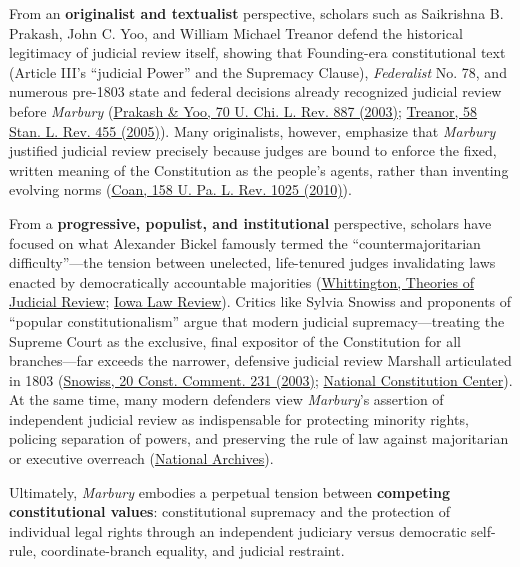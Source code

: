 \documentclass[12pt]{article}
\begin{document}
From an \textbf{originalist and textualist} perspective, scholars such as Saikrishna B. Prakash, John C. Yoo, and William Michael Treanor defend the historical legitimacy of judicial review itself, showing that Founding-era constitutional text (Article III's ``judicial Power'' and the Supremacy Clause), \textit{Federalist} No. 78, and numerous pre-1803 state and federal decisions already recognized judicial review before \textit{Marbury} (\href{https://chicagounbound.uchicago.edu/uclrev/vol70/iss3/3/}{Prakash \& Yoo, 70 U. Chi. L. Rev. 887 (2003)}; \href{https://scholarship.law.georgetown.edu/context/facpub/article/2040/viewcontent/58StanLRev455.pdf}{Treanor, 58 Stan. L. Rev. 455 (2005)}). Many originalists, however, emphasize that \textit{Marbury} justified judicial review precisely because judges are bound to enforce the fixed, written meaning of the Constitution as the people's agents, rather than inventing evolving norms (\href{https://www.law.upenn.edu/live/files/47-coan158upalrev10252010pdf}{Coan, 158 U. Pa. L. Rev. 1025 (2010)}).

From a \textbf{progressive, populist, and institutional} perspective, scholars have focused on what Alexander Bickel famously termed the ``countermajoritarian difficulty''---the tension between unelected, life-tenured judges invalidating laws enacted by democratically accountable majorities (\href{http://www.princeton.edu/~kewhitt/judicial_review}{Whittington, Theories of Judicial Review}; \href{https://ilr.law.uiowa.edu/sites/ilr.law.uiowa.edu/files/2025-11/A3_Dodson_1.pdf}{Iowa Law Review}). Critics like Sylvia Snowiss and proponents of ``popular constitutionalism'' argue that modern judicial supremacy---treating the Supreme Court as the exclusive, final expositor of the Constitution for all branches---far exceeds the narrower, defensive judicial review Marshall articulated in 1803 (\href{https://scholarship.law.umn.edu/cgi/viewcontent.cgi?article=2076&context=concomm}{Snowiss, 20 Const. Comment. 231 (2003)}; \href{https://constitutioncenter.org/blog/marbury-v-madison-and-the-independent-supreme-court}{National Constitution Center}). At the same time, many modern defenders view \textit{Marbury}'s assertion of independent judicial review as indispensable for protecting minority rights, policing separation of powers, and preserving the rule of law against majoritarian or executive overreach (\href{https://www.archives.gov/milestone-documents/marbury-v-madison}{National Archives}).

Ultimately, \textit{Marbury} embodies a perpetual tension between \textbf{competing constitutional values}: constitutional supremacy and the protection of individual legal rights through an independent judiciary versus democratic self-rule, coordinate-branch equality, and judicial restraint.
\end{document}

